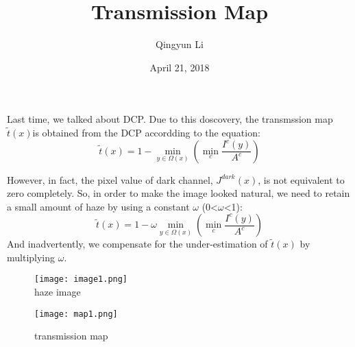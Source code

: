 \documentclass{article}
\author{Qingyun Li}
\date{April 21, 2018}
\title{Transmission Map}
\begin{document}
\maketitle
\par Last time, we talked about DCP. Due to this doscovery, the transmssion map$\tilde{t}(x) $is obtained from the DCP accordding to the equation:
\begin{equation}
\tilde{t}(x)=1-\min\limits_{y\in\Omega(x)}(\min\limits_{c}\frac{I^{c}(y)}{A^c})
\end{equation}
\par However, in fact, the pixel value of dark channel, $J^{dark}(x)$, is not equivalent to zero completely. So, in order to make the image looked natural, we need to retain a small amount of haze by using a constant $\omega$ (0<$\omega$<1):\begin{equation}
\tilde{t}(x)=1-\omega \min\limits_{y\in\Omega(x)}(\min\limits_{c}\frac{I^{c}(y)}{A^c})
\end{equation}
And inadvertently, we compensate for the under-estimation of $\tilde{t}(x)$ by multiplying $\omega$. 
\begin{figure}[htbp]
\begin{minipage}{0.5\linewidth}
\centering{}
\texttt{[image: image1.png]}\\
\caption{haze image}\label{image} 
\end{minipage}
\hfill
\begin{minipage}{0.5\linewidth}
\centering{}
\texttt{[image: map1.png]}\\
\caption{transmission map}\label{map}
\end{minipage} 
\end{figure}
\end{document}
